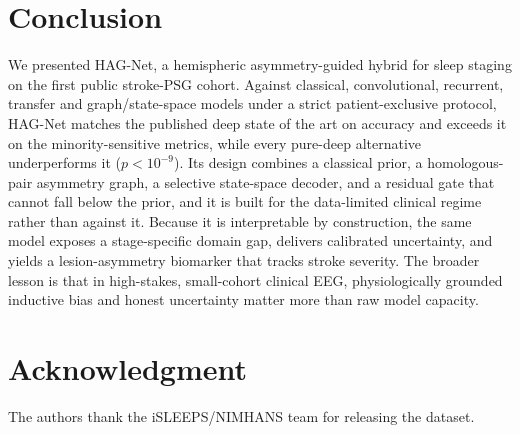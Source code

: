 \documentclass[journal]{IEEEtran}
\begin{document}
\section{Conclusion}
We presented HAG-Net, a hemispheric asymmetry-guided hybrid for sleep staging on the
first public stroke-PSG cohort. Against classical, convolutional, recurrent,
transfer and graph/state-space models under a strict patient-exclusive protocol,
HAG-Net matches the published deep state of the art on accuracy and exceeds it on
the minority-sensitive metrics, while every pure-deep alternative underperforms it
($p<10^{-9}$). Its design combines a classical prior, a homologous-pair asymmetry
graph, a selective state-space decoder, and a residual gate that cannot fall below
the prior, and it is built for the data-limited clinical regime rather than against
it. Because it is interpretable by construction, the same model exposes a
stage-specific domain gap, delivers calibrated uncertainty, and yields a
lesion-asymmetry biomarker that tracks stroke severity. The broader lesson is that
in high-stakes, small-cohort clinical EEG, physiologically grounded inductive bias
and honest uncertainty matter more than raw model capacity.

\section*{Acknowledgment}
The authors thank the iSLEEPS/NIMHANS team for releasing the dataset.



\end{document}
